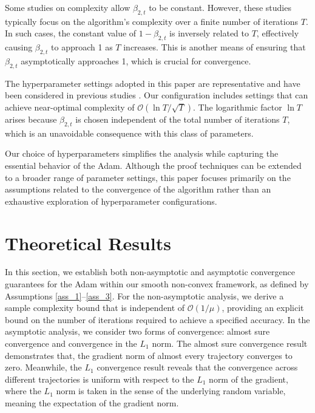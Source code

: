 \documentclass{article} %
\begin{document}
Some studies on complexity allow \( \beta_{2,t} \) to be constant. However, these studies typically focus on the algorithm's complexity over a finite number of iterations \( T \). In such cases, the constant value of \(1-\beta_{2,t} \) is inversely related to \( T \), effectively causing \( \beta_{2,t} \) to approach 1 as \( T \) increases. This is another means of ensuring that \( \beta_{2,t} \) asymptotically approaches 1, which is crucial for convergence.

The hyperparameter settings adopted in this paper are representative and have been considered in previous studies \citep{zou2019sufficient,he2023convergence}. Our configuration includes settings that can achieve near-optimal complexity of \( \mathcal{O}(\ln T / \sqrt{T}) \). The logarithmic factor \( \ln T \) arises because \( \beta_{2,t} \) is chosen independent of the total number of iterations \( T \), which is an unavoidable consequence with this class of parameters.

Our choice of hyperparameters simplifies the analysis while capturing the essential behavior of the Adam. Although the proof techniques can be extended to a broader range of parameter settings, this paper focuses primarily on the assumptions related to the convergence of the algorithm rather than an exhaustive exploration of hyperparameter configurations.


\section{Theoretical Results}

In this section, we establish both non-asymptotic and asymptotic convergence guarantees for the Adam within our smooth non-convex framework, as defined by Assumptions \ref{ass_1}--\ref{ass_3}. For the non-asymptotic analysis, we derive a sample complexity bound that is independent of \(\mathcal{O}(1/\mu)\), providing an explicit bound on the number of iterations required to achieve a specified accuracy. In the asymptotic analysis, we consider two forms of convergence: almost sure convergence and convergence in the \(L_1\) norm. The almost sure convergence result demonstrates that, the gradient norm of almost every trajectory converges to zero. Meanwhile, the \(L_1\) convergence result reveals that the convergence across different trajectories is uniform with respect to the \(L_1\) norm of the gradient, where the \(L_1\) norm is taken in the sense of the underlying random variable, meaning the expectation of the gradient norm.
\end{document}
